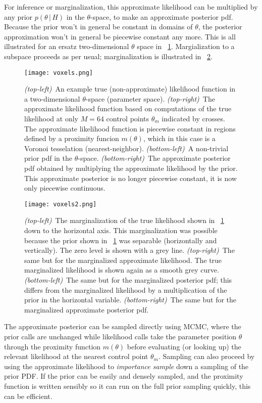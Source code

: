 \documentclass[12pt]{article}
\newcommand{\given}{\,|\,}
\begin{document}
For inference or marginalization, this approximate likelihood can be
multiplied by any prior $p(\theta\given H)$ in the $\theta$-space, to
make an approximate posterior pdf.  Because the prior won't in general
be constant in domains of $\theta$, the posterior approximation won't
in general be piecewise constant any more.  This is all illustrated
for an ersatz two-dimensional $\theta$ space in
\figurename~\ref{fig:posterior}.  Margialization to a subspace
proceeds as per usual; marginalization is illustrated in
\figurename~\ref{fig:marginal}.

\begin{figure}[p]
\texttt{[image: voxels.png]}
\caption{\textsl{(top-left)}~An example true (non-approximate)
  likelihood function in a two-dimensional $\theta$-space (parameter
  space). \textsl{(top-right)}~The approximate likelihood function
  based on computations of the true likelihood at only $M=64$ control
  points $\theta_m$ indicated by crosses.  The approximate likelihood
  function is piecewise constant in regions defined by a proximity
  funcion $m(\theta)$, which in this case is a Voronoi tesselation
  (nearest-neighbor).  \textsl{(bottom-left)}~A non-trivial prior pdf
  in the $\theta$-space.  \textsl{(bottom-right)}~The approximate
  posterior pdf obtained by multiplying the approximate likelihood by
  the prior.  This approximate posterior is no longer piecewise
  constant, it is now only piecewise continuous.\label{fig:posterior}}
\end{figure}

\begin{figure}[p]
\texttt{[image: voxels2.png]}
\caption{\textsl{(top-left)}~The marginalization of the true
  likelihood shown in \figurename~\ref{fig:posterior} down to the
  horizontal axis.  This marginalization was possible because the
  prior shown in \figurename~\ref{fig:posterior} was separable
  (horizontally and vertically).  The zero level is shown with a grey
  line.  \textsl{(top-right)}~The same but for the marginalized
  approximate likelihood.  The true marginalized likelihood is shown
  again as a smooth grey curve.  \textsl{(bottom-left)}~The same but
  for the marginalized posterior pdf; this differs from the
  marginalized likelihood by a multiplication of the prior in the
  horizontal variable.  \textsl{(bottom-right)}~The same but for the
  marginalized approximate posterior pdf.\label{fig:marginal}}
\end{figure}

The approximate posterior can be sampled directly using MCMC, where
the prior calls are unchanged while likelihood calls take the
parameter position $\theta$ through the proximity function $m(\theta)$
before evaluating (or looking up) the relevant likelihood at the
nearest control point $\theta_m$.  Sampling can also proceed by using
the approximate likelihood to \emph{importance sample} down a sampling
of the prior PDF.  If the prior can be easily and densely sampled, and
the proximity function is written sensibly so it can run on the full
prior sampling quickly, this can be efficient.
\end{document}
